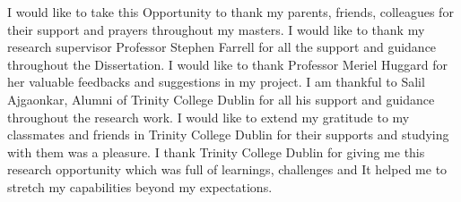 \documentclass[a4paper, 12pt, oneside]{report}         %
\begin{document}

\thesistitlepage                                  %

\thesisdeclarationpage                %

\thesispermissionpage                 %





\begin{thesisacknowledgments}   



I would like to take this Opportunity to thank my parents, friends, colleagues for their support and prayers throughout my masters. I would like to thank my research supervisor Professor Stephen Farrell for all the support and guidance throughout the Dissertation. I would like to thank Professor Meriel Huggard for her valuable feedbacks and suggestions in my project. I am thankful to Salil Ajgaonkar, Alumni of Trinity College Dublin for all his support and guidance throughout the research work. I would like to extend my gratitude to my classmates and friends in Trinity College Dublin for their supports and studying with them was a pleasure. I thank Trinity College Dublin for giving me this research opportunity which was full of learnings, challenges and It helped me to stretch my capabilities beyond my expectations.


\end{thesisacknowledgments}                       %
\end{document}
